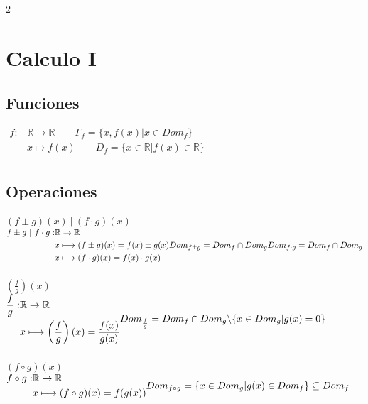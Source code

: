             \begin{multicols}{2}
              \section{Calculo I}
              \subsection{Funciones}

              $
              \begin{aligned}
                f : &\mathbb{R} \rightarrow \mathbb{R} \quad \quad \Gamma_f=\{x,f(x) | x \in Dom_f\}\\
                &x \longmapsto f(x)    \quad \quad  D_f = \{ x \in \mathbb{R} | f(x) \in \mathbb{R} \}\\
              \end{aligned}
              $
              \subsection{Operaciones}
              $(f \pm g) (x) \ | \ (f \cdot g) (x)$
              \\
              $
              \begin{aligned}
                f \pm g \ | \ f \cdot g: &\mathbb{R} \rightarrow \mathbb{R}\\
                &x \longmapsto (f\pm g)(x) = f(x) \pm g(x) \\
                &x \longmapsto (f\cdot g)(x) = f(x) \cdot g(x)
              \end{aligned}
              \\
              Dom_{f \pm g}= Dom_f \cap Dom_g \\  Dom_{f \cdot g}= Dom_f \cap Dom_g
              $
              \\\\
              $\left(\frac{f}{g}\right) (x)$
              \\
              $
              \begin{aligned}
                \frac{f}{g} : &\mathbb{R} \rightarrow \mathbb{R}\\
                &x \longmapsto \left(\frac{f}{g}\right)(x) = \frac{f(x)}{g(x)}
              \end{aligned}
              \\
              Dom_{\frac{f}{g}}= Dom_f \cap Dom_g \backslash \{ x \in Dom_g | g(x) = 0\}
              $
              \\\\
              $(f \circ g) (x)$
              \\
              $
              \begin{aligned}
                f \circ g : &\mathbb{R} \rightarrow \mathbb{R}\\
                &x \longmapsto (f\circ g)(x) = f(g(x))
              \end{aligned}
              \\
              Dom_{f \circ g}= \{ x \in Dom_g | g(x) \in Dom_f\} \subseteq Dom_f
              $


\end{multicols}

